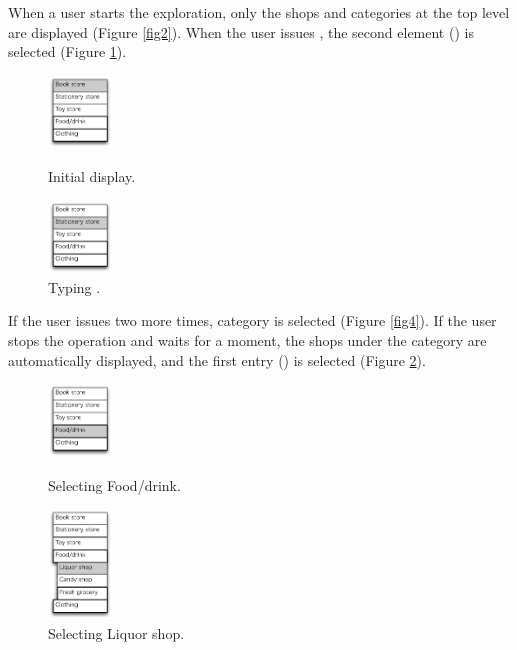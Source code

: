 \documentclass[conference]{IEEEtran}
\def\down{\tsf{▼}}
\begin{document}
When a user starts the exploration, only the shops and categories
at the top level are displayed (Figure \ref{fig2}).
When the user issues {\down},
the second element () is selected (Figure \ref{fig3}).

\def\menuwidth{22mm}

\begin{figure}[H]
  \begin{minipage}{0.45\hsize}
    \centerline{\includegraphics[width=17mm, bb=0 0 139 157]{figures/fig2.pdf}}
    \caption{Initial display.}
    \label{fig2}
  \end{minipage}
  \begin{minipage}{0.45\hsize}
    \centerline{\includegraphics[width=17mm,bb=0 0 139 157]{figures/fig3.pdf}}
    \caption{Typing {\down}.}
    \label{fig3}
  \end{minipage}
\end{figure}

If the user issues {\down} two more times, 
 category is selected (Figure \ref{fig4}).
If the user stops the operation and waits for a moment, the shops under the 
category are automatically displayed,
and the first entry () is selected (Figure \ref{fig5}).

\begin{figure}[H]
  \begin{minipage}{0.45\hsize}
    \centerline{\includegraphics[width=17mm,bb=0 0 139 157]{figures/fig4.pdf}}
    \caption{Selecting Food/drink.}
    \label{fig4}
  \end{minipage}
  \begin{minipage}{0.45\hsize}
    \centerline{\includegraphics[width=17mm,bb=0 0 139 238]{figures/fig5.pdf}}
    \caption{Selecting Liquor shop.}
    \label{fig5}
  \end{minipage}
\end{figure}
\end{document}
